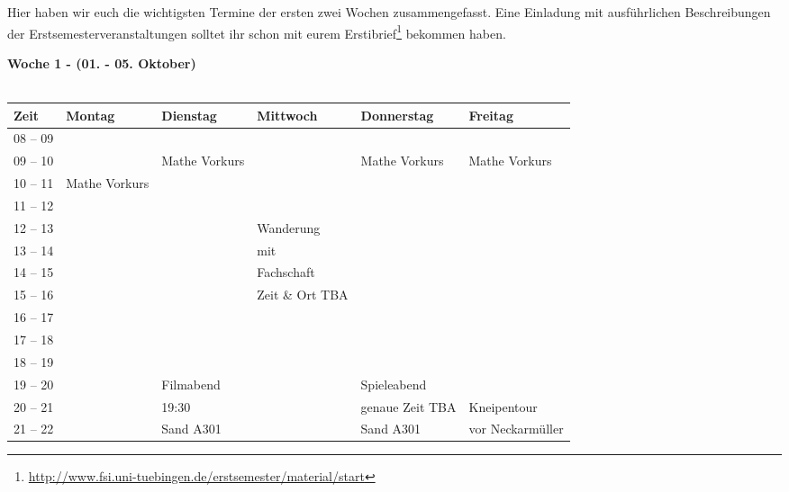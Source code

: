 Hier haben wir euch die wichtigsten Termine der ersten zwei Wochen zusammengefasst. Eine Einladung mit ausführlichen Beschreibungen der Erstsemesterveranstaltungen solltet ihr schon mit eurem Erstibrief\footnote{\url{http://www.fsi.uni-tuebingen.de/erstsemester/material/start}} bekommen haben.
\vfill


\textbf{Woche 1 - (01. - 05. Oktober)}\\
\\
\begin{tabular}{|l|p{}|p{}|p{}|p{}|p{}|} \hline
 Zeit & Montag & Dienstag & Mittwoch & Donnerstag & Freitag \\ 
 \hline \hline
 08 -- 09 & & & & & \\ \cline{1-1} \cline{3-3}\cline{5-6}
 09 -- 10 & & \footnotesize{Mathe Vorkurs} & & \footnotesize{Mathe Vorkurs} & \footnotesize{Mathe Vorkurs} \\ \cline{1-2}
 10 -- 11 & \footnotesize{Mathe Vorkurs} & & & & \\ \cline{1-1}
 11 -- 12 & & & & & \\ \cline{1-1}\cline{4-4}
 12 -- 13 & & & \cellcolor{lightlightgray} \footnotesize{Wanderung} & & \\ \cline{1-1}
 13 -- 14 & & & \cellcolor{lightlightgray} \footnotesize{mit} & & \\ \cline{1-1}
 14 -- 15 & & & \cellcolor{lightlightgray} \footnotesize{Fachschaft} & & \\ \cline{1-1}
 15 -- 16 & & & \cellcolor{lightlightgray} \scriptsize{Zeit \& Ort TBA} & & \\ \cline{1-3} \cline{5-6}
 16 -- 17 & & & \cellcolor{lightlightgray} & & \\ \cline{1-1}
 17 -- 18 & & & \cellcolor{lightlightgray} & & \\ \cline{1-1}
 18 -- 19 & & & \cellcolor{lightlightgray} & & \\ \cline{1-1} \cline{3-3} \cline{5-5}
 19 -- 20 & & \cellcolor{lightlightgray} \footnotesize{Filmabend} & \cellcolor{lightlightgray} & \cellcolor{lightlightgray} \footnotesize{Spieleabend} & \\ \cline{1-1} \cline{4-4}\cline{6-6}
 20 -- 21 & & \cellcolor{lightlightgray} \scriptsize{19:30} & & \cellcolor{lightlightgray} \scriptsize{genaue Zeit TBA} & \cellcolor{lightlightgray} \footnotesize{Kneipentour} \\ \cline{1-1}
 21 -- 22 & & \cellcolor{lightlightgray} \scriptsize{Sand A301} & & \cellcolor{lightlightgray} \scriptsize{Sand A301} & \cellcolor{lightlightgray} \scriptsize{vor Neckarmüller}\\ \hline
 \end{tabular}
\vfil

